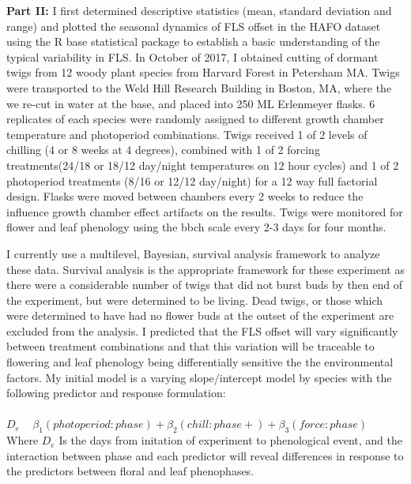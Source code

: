 \documentclass{article}\usepackage[]{graphicx}\usepackage[]{color}
\begin{document}
\textbf{Part II:} I first determined descriptive statistics (mean, standard deviation and range) and plotted the seasonal dynamics of FLS offset in the HAFO dataset using the R base statistical package to establish a basic understanding of the typical variability in FLS. In October of 2017, I obtained cutting of dormant twigs from 12 woody plant species from Harvard Forest in Petersham MA. Twigs were transported to the Weld Hill Research Building in Boston, MA, where the we re-cut in water at the base, and placed into 250 ML Erlenmeyer flasks. 6 replicates of each species were randomly assigned to different growth chamber temperature and photoperiod combinations. Twigs received 1 of 2 levels of chilling (4 or 8 weeks at 4 degrees), combined with 1 of 2 forcing treatments(24/18 or 18/12 day/night temperatures on 12 hour cycles) and 1 of 2 photoperiod treatments (8/16 or 12/12 day/night) for a 12 way full factorial design. Flasks were moved between chambers every 2 weeks to reduce the influence growth chamber effect artifacts on the results. Twigs were monitored for flower and leaf phenology using the bbch scale \citep{Finn2007} every 2-3 days for four months.
\par I currently  use a multilevel, Bayesian, survival analysis framework to analyze these data. Survival analysis is the appropriate framework for these experiment as there were a considerable number of twigs that did not burst buds by then end of the experiment, but were determined to be living. Dead twigs, or those which were determined to have had no flower buds at the outset of the experiment are excluded from the analysis. I predicted that the FLS offset will vary significantly between treatment combinations and that this variation will be traceable to flowering and leaf phenology being differentially sensitive the the environmental factors. My initial model is a varying slope/intercept model by species with the following predictor and response formulation:\\
\\
$D_e$ ~ $\beta_1(photoperiod:phase)+\beta_2(chill:phase+)+\beta_3 (force:phase) $\\

Where $D_e$ Is the days from initation of experiment to phenological event, and the interaction between phase and each predictor will reveal differences in response to the predictors between floral and leaf phenophases.\\
\end{document}
